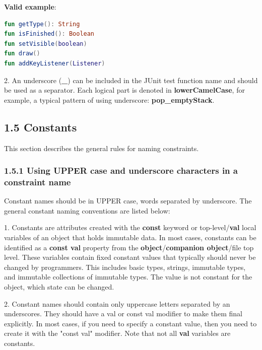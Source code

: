\textbf{Valid example}: 



\begin{lstlisting}[language=Kotlin]
fun getType(): String
fun isFinished(): Boolean
fun setVisible(boolean)
fun draw()
fun addKeyListener(Listener)
\end{lstlisting}


2.	An underscore (\textbf{\_}) can be included in the JUnit test function name and should be used as a separator. Each logical part is denoted in \textbf{lowerCamelCase}, for example, a typical pattern of using underscore: \textbf{pop\_emptyStack}.

\subsection*{\textbf{1.5 Constants}}

\label{sec:1.5}

This section describes the general rules for naming constraints.

\subsubsection*{\textbf{1.5.1 Using UPPER case and underscore characters in a constraint name}}
\leavevmode\newline

\label{sec:1.5.1}

Constant names should be in UPPER case, words separated by underscore. The general constant naming conventions are listed below:

1. Constants are attributes created with the \textbf{const} keyword or top-level/\textbf{val} local variables of an object that holds immutable data. In most cases, constants can be identified as a \textbf{const val} property from the \textbf{object}/\textbf{companion object}/file top level. These variables contain fixed constant values that typically should never be changed by programmers. This includes basic types, strings, immutable types, and immutable collections of immutable types. The value is not constant for the object, which state can be changed.

2. Constant names should contain only uppercase letters separated by an underscores. They should have a val or const val modifier to make them final explicitly. In most cases, if you need to specify a constant value, then you need to create it with the "const val" modifier. Note that not all \textbf{val} variables are constants.

